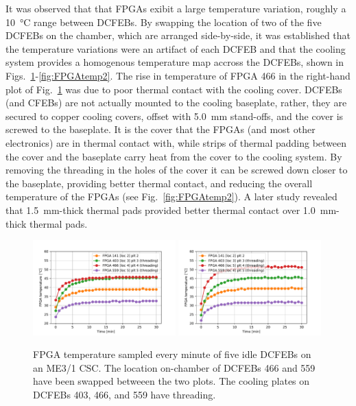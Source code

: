 It was observed that that FPGAs exibit a large temperature variation, roughly a \SI{10}{\celsius} range between DCFEBs. By swapping the location of two of the five DCFEBs on the chamber, which are arranged side-by-side, it was established that the temperature variations were an artifact of each DCFEB and that the cooling system provides a homogenous temperature map accross the DCFEBs, shown in Figs.~\ref{fig:FPGAtemp1}-\ref{fig:FPGAtemp2}. The rise in temperature of FPGA 466 in the right-hand plot of Fig.~\ref{fig:FPGAtemp1} was due to poor thermal contact with the cooling cover. DCFEBs (and CFEBs) are not actually mounted to the cooling baseplate, rather, they are secured to copper cooling covers, offset with \SI{5.0}{mm} stand-offs, and the cover is screwed to the baseplate. It is the cover that the FPGAs (and most other electronics) are in thermal contact with, while strips of thermal padding between the cover and the baseplate carry heat from the cover to the cooling system. By removing the threading in the holes of the cover it can be screwed down closer to the baseplate, providing better thermal contact, and reducing the overall temperature of the FPGAs (see Fig.~\ref{fig:FPGAtemp2}). A later study revealed that \SI{1.5}{mm}-thick thermal pads provided better thermal contact over \SI{1.0}{mm}-thick thermal pads.

\begin{figure}[H]
    \centering
    \includegraphics[width=0.49\textwidth]{Images/Phase2Upgrades/DCFEBTempStudy/TempPlot_2019_01_14_plot1-5295.pdf}
    \includegraphics[width=0.49\textwidth]{Images/Phase2Upgrades/DCFEBTempStudy/TempPlot_2019_01_14_plot2-5296.pdf}
    \caption{FPGA temperature sampled every minute of five idle DCFEBs on an ME3/1 CSC. The location on-chamber of DCFEBs 466 and 559 have been swapped betweeen the two plots. The cooling plates on DCFEBs 403, 466, and 559 have threading.}
    \label{fig:FPGAtemp1}
\end{figure}

